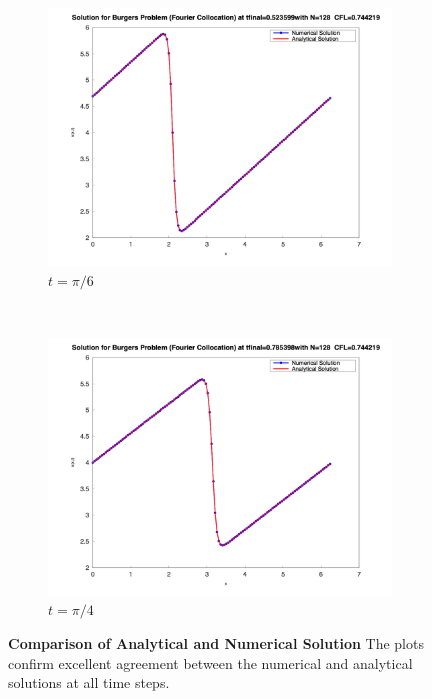 \begin{figure}[H]
	\begin{subfigure}{0.5\textwidth}
		\includegraphics[width=\textwidth]{media/burger_tfinal_fc_128_0.523599.png}
		\caption{$t = \pi / 6$}
		\label{sfig:sublabel3}
	\end{subfigure}%
	~
	\begin{subfigure}{0.5\textwidth}
		\includegraphics[width=\textwidth]{media/burger_tfinal_fc_128_0.785398.png}
		\caption{$t = \pi / 4$}
		\label{sfig:sublabel4}
	\end{subfigure}
	\caption{\textbf{Comparison of Analytical and Numerical Solution}
		The plots confirm excellent agreement between the numerical and analytical solutions at all time steps.
	}
	\label{fig:figureLabel}
\end{figure}
